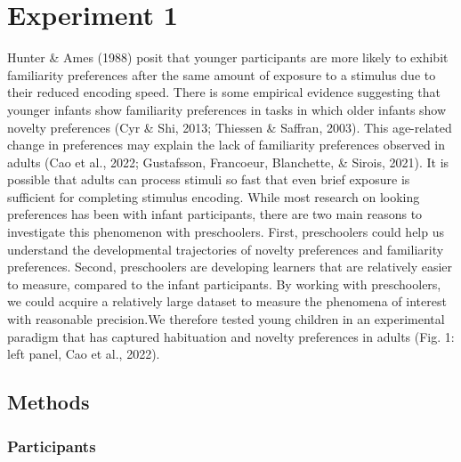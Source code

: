 \documentclass[10pt, letterpaper]{article}
\begin{document}
\hypertarget{experiment-1}{%
\section{Experiment 1}\label{experiment-1}}

Hunter \& Ames (1988) posit that younger participants are more likely to
exhibit familiarity preferences after the same amount of exposure to a
stimulus due to their reduced encoding speed. There is some empirical
evidence suggesting that younger infants show familiarity preferences in
tasks in which older infants show novelty preferences (Cyr \& Shi, 2013;
Thiessen \& Saffran, 2003). This age-related change in preferences may
explain the lack of familiarity preferences observed in adults (Cao et
al., 2022; Gustafsson, Francoeur, Blanchette, \& Sirois, 2021). It is
possible that adults can process stimuli so fast that even brief
exposure is sufficient for completing stimulus encoding. While most
research on looking preferences has been with infant participants, there
are two main reasons to investigate this phenomenon with preschoolers.
First, preschoolers could help us understand the developmental
trajectories of novelty preferences and familiarity preferences. Second,
preschoolers are developing learners that are relatively easier to
measure, compared to the infant participants. By working with
preschoolers, we could acquire a relatively large dataset to measure the
phenomena of interest with reasonable precision.We therefore tested
young children in an experimental paradigm that has captured habituation
and novelty preferences in adults (Fig. 1: left panel, Cao et al.,
2022).

\hypertarget{methods}{%
\subsection{Methods}\label{methods}}

\hypertarget{participants}{%
\subsubsection{Participants}\label{participants}}

\captionsetup{belowskip=0pt,aboveskip=0pt}
\end{document}
